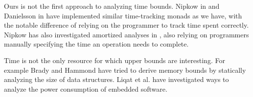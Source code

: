 Ours is not the first approach to analyzing time bounds. Nipkow in \cite{nipkow:2017:verified-root-balanced-trees} and Danielsson in \cite{danielsson:2008:time-complexity-analysis} have implemented similar time-tracking monads as we have, with the notable difference of relying on the programmer to track time spent correctly. Nipkow has also investigated amortized analyses in \cite{nipkow:2015:amortizedverified}, also relying on programmers manually specifying the time an operation needs to complete.

Time is not the only resource for which upper bounds are interesting. For example Brady and Hammond \cite{brady:2006:programsize} have tried to derive memory bounds by statically analyzing the size of data structures. Liqat et al. \cite{liqatetal:2013:energyconsumption} have investigated ways to analyze the power consumption of embedded software.
